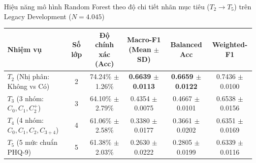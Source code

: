 \begin{table}{Hiệu năng mô hình Random Forest theo độ chi tiết nhãn mục tiêu ($T_2 \to T_5$) trên Legacy Development ($N = 4.045$)}
\centering
\small
\label{tab:granularity-results}
\begin{tabular}{l c c c c c}
\toprule
\textbf{Nhiệm vụ} & \textbf{Số lớp} & \textbf{Độ chính xác (Acc)} & \textbf{Macro-F1 (Mean $\pm$ SD)} & \textbf{Balanced Acc} & \textbf{Weighted-F1} \\
\midrule
$T_2$ (Nhị phân: Không vs Có) & 2 & 74.24\% $\pm$ 1.26\% & \textbf{0.6639 $\pm$ 0.0113} & \textbf{0.6659 $\pm$ 0.0122} & 0.7436 $\pm$ 0.0100 \\
$T_3$ (3 nhóm: $C_0, C_1, C_2^+$) & 3 & 64.10\% $\pm$ 2.79\% & 0.4354 $\pm$ 0.0075 & 0.4667 $\pm$ 0.0101 & 0.6538 $\pm$ 0.0156 \\
$T_4$ (4 nhóm: $C_0, C_1, C_2, C_{3+4}$) & 4 & 61.06\% $\pm$ 2.58\% & 0.3380 $\pm$ 0.0177 & 0.3661 $\pm$ 0.0202 & 0.6351 $\pm$ 0.0169 \\
$T_5$ (5 mức chuẩn PHQ-9) & 5 & 61.38\% $\pm$ 2.03\% & 0.2630 $\pm$ 0.0222 & 0.2805 $\pm$ 0.0199 & 0.6339 $\pm$ 0.0116 \\
\bottomrule
\end{tabular}
\end{table}
